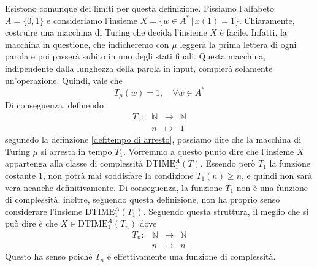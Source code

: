 \begin{rema}
    Esistono comunque
    dei limiti per questa definizione.
    Fissiamo l'alfabeto $A=\{0,1\}$
    e
    consideriamo l'insieme
    $X=\{ w \in A^* \, | \, x(1)=1 \}$.
    Chiaramente, costruire una macchina di Turing che decida l'insieme $X$
    è facile. Infatti, la
    macchina in questione,
    che indicheremo con $\mu$
    leggerà la prima lettera di ogni parola
    e poi passerà subito in uno degli stati finali.
    Questa macchina,
    indipendente dalla lunghezza della parola in input,
    compierà solamente un'operazione. 
    Quindi, vale che
    \[
    T_\mu(w)=1, \quad \forall w \in A^*
    \]
    Di conseguenza, definendo
    \[
    \begin{matrix}
        T_1: & \mathbb N & \to & \mathbb N 
        \\
        & n & \mapsto & 1
    \end{matrix}
    \]
    segunedo la definzione \ref{def:tempo di arresto},
    possiamo dire che la macchina di
    Turing $\mu$ si arresta in tempo
    $T_1$.
    Vorremmo a questo punto dire che
    l'insieme $X$
    appartenga alla classe di complessità
    $\mathrm{DTIME}_1^A(T)$.
    Essendo però $T_1$
    la funzione costante $1$,
    non potrà mai soddisfare la condizione
    $T_1(n)\geq n$, e quindi
    non sarà vera neanche definitivamente.
    Di conseguenza,
    la funzione $T_1$ non è
    una funzione di complessità;
    inoltre, seguendo questa definizione,
    non ha proprio senso considerare
    l'insieme $\mathrm{DTIME}_1^A(T_1)$.
    Seguendo questa struttura,
    il meglio che si può dire è che $X \in \mathrm{DTIME}_1^A(T_{n})$
    dove
    \[
    \begin{matrix}
        T_n: & \mathbb N & \to & \mathbb N 
        \\
        & n & \mapsto & n
    \end{matrix}
    \]
    Questo ha senso poichè $T_n$ è 
    effettivamente una funzione di complessità.
\end{rema}

